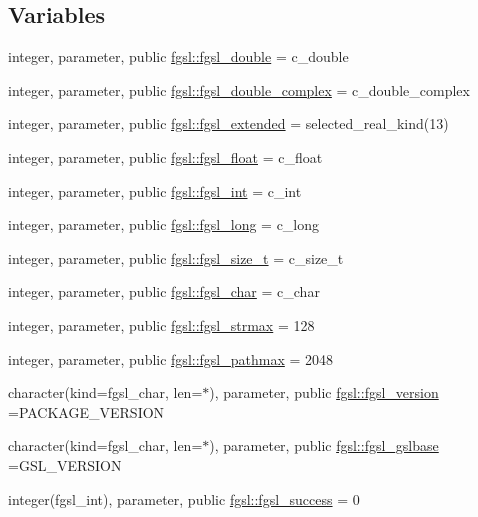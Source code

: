 \subsection*{Variables}
\begin{DoxyCompactItemize}
\item 
integer, parameter, public \hyperlink{namespacefgsl_a9af5113378e0f000eb479d3f90196ddf}{fgsl\+::fgsl\+\_\+double} = c\+\_\+double
\item 
integer, parameter, public \hyperlink{namespacefgsl_a66d0fde3788cc0c300046f8fcd07d702}{fgsl\+::fgsl\+\_\+double\+\_\+complex} = c\+\_\+double\+\_\+complex
\item 
integer, parameter, public \hyperlink{namespacefgsl_a9f38abe97062020e8a507aaa5bc683ab}{fgsl\+::fgsl\+\_\+extended} = selected\+\_\+real\+\_\+kind(13)
\item 
integer, parameter, public \hyperlink{namespacefgsl_a5721fab55a48ca577c4557fdb1861eb6}{fgsl\+::fgsl\+\_\+float} = c\+\_\+float
\item 
integer, parameter, public \hyperlink{namespacefgsl_a222deda1d7a0c0e845ce4a683318efeb}{fgsl\+::fgsl\+\_\+int} = c\+\_\+int
\item 
integer, parameter, public \hyperlink{namespacefgsl_a22fca1111887118eb07d5f9688ea38ad}{fgsl\+::fgsl\+\_\+long} = c\+\_\+long
\item 
integer, parameter, public \hyperlink{namespacefgsl_a82c8fc2281b4c13609c41ae8b7f1cb1e}{fgsl\+::fgsl\+\_\+size\+\_\+t} = c\+\_\+size\+\_\+t
\item 
integer, parameter, public \hyperlink{namespacefgsl_a12911ae4a4462f8e892d903081e77ab4}{fgsl\+::fgsl\+\_\+char} = c\+\_\+char
\item 
integer, parameter, public \hyperlink{namespacefgsl_a1951faf9d6c8119266db0e5eee1865b7}{fgsl\+::fgsl\+\_\+strmax} = 128
\item 
integer, parameter, public \hyperlink{namespacefgsl_a4531e537443b76eab7842214d4e86f01}{fgsl\+::fgsl\+\_\+pathmax} = 2048
\item 
character(kind=fgsl\+\_\+char, len=$\ast$), parameter, public \hyperlink{namespacefgsl_a3443bae7bac02745f1562e6c2f891656}{fgsl\+::fgsl\+\_\+version} =P\+A\+C\+K\+A\+G\+E\+\_\+\+V\+E\+R\+S\+I\+O\+N
\item 
character(kind=fgsl\+\_\+char, len=$\ast$), parameter, public \hyperlink{namespacefgsl_ad8d3e2a5a480d0a6e9569ef516c5dff4}{fgsl\+::fgsl\+\_\+gslbase} =G\+S\+L\+\_\+\+V\+E\+R\+S\+I\+O\+N
\item 
integer(fgsl\+\_\+int), parameter, public \hyperlink{namespacefgsl_a5637d95a4aceec9a80a9b74a2e40ebdf}{fgsl\+::fgsl\+\_\+success} = 0

\end{DoxyCompactItemize}
